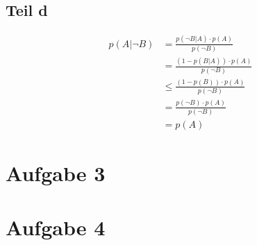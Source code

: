 \documentclass[10pt,a4paper]{article}
\begin{document}
\subsection{Teil d}

\begin{align*}
  p(A | \lnot B) & = \frac{p(\lnot B | A) \cdot p(A)}{p(\lnot B)}\\
  & = \frac{(1 - p(B | A)) \cdot p(A)}{p(\lnot B)}\\
  & \le \frac{(1 - p(B)) \cdot p(A)}{p(\lnot B)}\\
  & = \frac{p(\lnot B) \cdot p(A)}{p(\lnot B)}\\
  & = p(A)
\end{align*}

\section{Aufgabe 3}

\section{Aufgabe 4}
\end{document}
